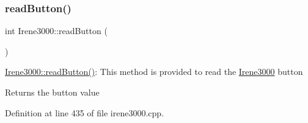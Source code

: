 \subsubsection{\texorpdfstring{read\+Button()}{readButton()}}
{\footnotesize\ttfamily int Irene3000\+::read\+Button (\begin{DoxyParamCaption}{ }\end{DoxyParamCaption})}

\hyperlink{class_irene3000_a78a87eb7cf295b95c12b2ebd51c2bb77}{Irene3000\+::read\+Button()}\+: This method is provided to read the \hyperlink{class_irene3000}{Irene3000} button

\begin{DoxyReturn}{Returns}
the button value 
\end{DoxyReturn}


Definition at line 435 of file irene3000.\+cpp.


